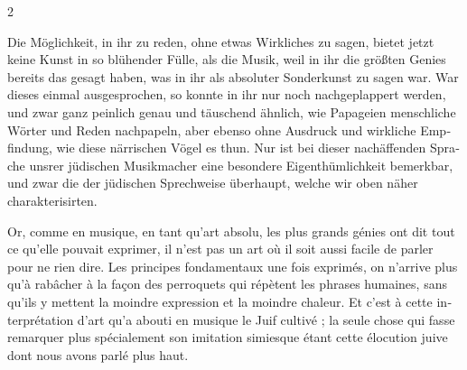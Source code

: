 \documentclass[a4paper,12pt]{article}
\newcommand\chunks[2]{%
\begin{leftcolumn*}\begin{otherlanguage}{german}%
{#1}%
\end{otherlanguage}\end{leftcolumn*}%
\begin{rightcolumn}\begin{otherlanguage}{french}%
{#2}%
\end{otherlanguage}\end{rightcolumn}%
}
\begin{document}
\begin{paracol}{2}
  \chunks{Die Möglichkeit, in ihr zu reden, ohne etwas Wirkliches zu sagen, bietet jetzt keine Kunst in so blühender Fülle, als die Musik, weil in ihr die größten Genies bereits das gesagt haben, was in ihr als absoluter Sonderkunst zu sagen war. War dieses einmal ausgesprochen, so konnte in ihr nur noch nachgeplappert werden, und zwar ganz peinlich genau und täuschend ähnlich, wie Papageien menschliche Wörter und Reden nachpapeln, aber ebenso ohne Ausdruck und wirkliche Empfindung, wie diese närrischen Vögel es thun. Nur ist bei dieser nachäffenden Sprache unsrer jüdischen Musikmacher eine besondere Eigenthümlichkeit bemerkbar, und zwar die der jüdischen Sprechweise überhaupt, welche wir oben näher charakterisirten.}
         {Or, comme en musique, en tant qu’art absolu, les plus grands génies ont dit tout ce qu’elle pouvait exprimer, il n’est pas un art où il soit aussi facile de parler pour ne rien dire. Les principes fondamentaux une fois exprimés, on n’arrive plus qu’à rabâcher à la façon des perroquets qui répètent les phrases humaines, sans qu’ils y mettent la moindre expression et la moindre chaleur. Et c’est à cette interprétation d’art qu’a abouti en musique le Juif cultivé ; la seule chose qui fasse remarquer plus spécialement son imitation simiesque étant cette élocution juive dont nous avons parlé plus haut.}

\end{paracol}
\end{document}
